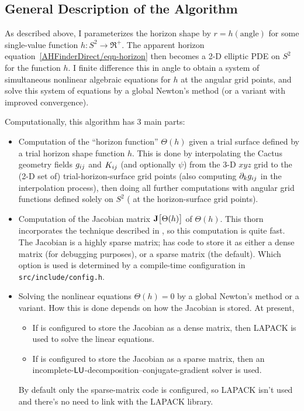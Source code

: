 
\subsection{General Description of the Algorithm}

As described above, I parameterizes the horizon shape by
$r = h(\text{angle})$ for some single-value function $h: S^2 \to \Re^+$.
The apparent horizon equation~\eqref{AHFinderDirect/eqn-horizon}
then becomes a 2-D elliptic PDE on $S^2$ for the function $h$.  I finite
difference this in angle to obtain a system of simultaneous nonlinear
algebraic equations for $h$ at the angular grid points, and solve this
system of equations by a global Newton's method (or a variant with
improved convergence).

Computationally, this algorithm has 3 main parts:
\begin{itemize}
\item	Computation of the ``horizon function'' $\Theta(h)$ given a trial
	surface defined by a trial horizon shape function $h$.  This is
	done by interpolating the Cactus geometry fields $g_{ij}$ and
	$K_{ij}$ (and optionally $\psi$) from the 3-D $xyz$ grid to the
	(2-D set of) trial-horizon-surface grid points (also computing
	$\partial_k g_{ij}$ in the interpolation process), then doing
	all further computations with angular grid functions defined
	solely on $S^2$ (\ie{} at the horizon-surface grid points).
\item	Computation of the Jacobian matrix $\Jac[\Theta(h)]$ of $\Theta(h)$.
	This thorn incorporates the  technique
	described in \cite{AHFinderDirect/Thornburg95},
	so this computation is quite fast.  The Jacobian is a highly
	sparse matrix;  has code to store it
	as either a dense matrix (for debugging purposes), or a sparse
	matrix (the default).  Which option is used is determined by
	a compile-time configuration in \verb|src/include/config.h|.
\item	Solving the nonlinear equations $\Theta(h) = 0$ by a global
	Newton's method or a variant.  How this is done depends on how
	the Jacobian is stored.  At present,
	\begin{itemize}
	\item	If  is configured to store the
		Jacobian as a dense matrix, then LAPACK is used to solve
		the linear equations.
	\item	If  is configured to store the
		Jacobian as a sparse matrix, then an
		incomplete-$\sf LU$-decomposition--conjugate-gradient
		solver is used.
	\end{itemize}
	By default only the sparse-matrix code is configured, so LAPACK
	isn't used and there's no need to link with the LAPACK library.
\end{itemize}

